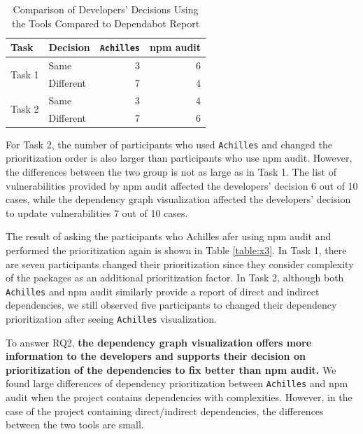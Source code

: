 \documentclass[conference]{IEEEtran}
\begin{document}
	
	\begin{table}[tb]
		\centering
		\caption{Comparison of Developers' Decisions Using the Tools Compared to Dependabot Report}
		\begin{tabular}{llrr}
			\toprule
			Task & Decision & \texttt{Achilles} & npm audit \\
			\midrule
			\multirow{2}{*}{Task 1} & Same & 3 & 6 \\ 
			& Different & 7 & 4 \\ \midrule
			\multirow{2}{*}{Task 2} & Same & 3 & 4 \\ 
			& Different & 7 & 6 \\
			\bottomrule
		\end{tabular}
		\label{table:compare-ach-npm}
	\end{table}
	
	For Task 2, the number of participants who used \texttt{Achilles} and changed the prioritization order is also larger than participants who use npm audit. 
	However, the differences between the two group is not as large as in Task 1. The list of vulnerabilities provided by npm audit affected the developers' decision 6 out of 10 cases, while the dependency graph visualization affected the developers' decision to update vulnerabilities 7 out of 10 cases.
	
	The result of asking the participants who Achilles afer using npm audit and performed the prioritization again is shown in Table \ref{table:x3}. In Task 1, there are seven participants changed their prioritization since they consider complexity of the packages as an additional prioritization factor. In Task 2, although both \texttt{Achilles} and npm audit similarly provide a report of direct and indirect dependencies, we still observed five participants to changed their dependency prioritization after seeing \texttt{Achilles} visualization.
	
	To answer RQ2, \textbf{the dependency graph visualization offers more information to the developers and supports their decision on prioritization of the dependencies to fix better than npm audit.} We found large differences of dependency prioritization between \texttt{Achilles} and npm audit when the project contains dependencies with complexities. However, in the case of the project containing direct/indirect dependencies, the differences between the two tools are small.
	
\end{document}
